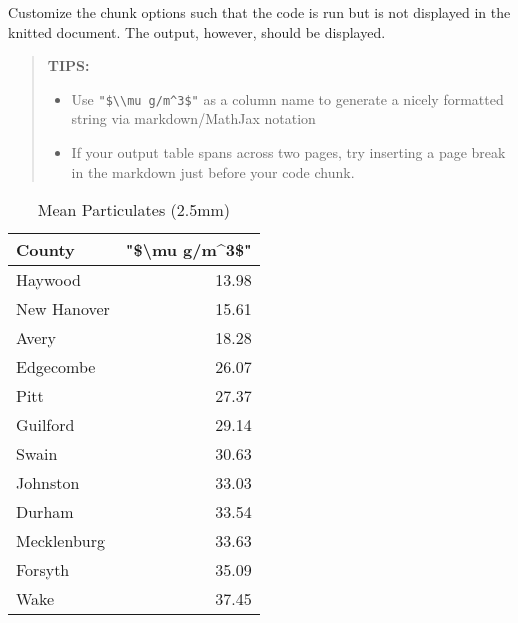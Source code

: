 \documentclass[
]{article}
\begin{document}
Customize the chunk options such that the code is run but is not
displayed in the knitted document. The output, however, should be
displayed.

\begin{quote}
\textbf{TIPS:}

\begin{itemize}
\item
  Use \texttt{"\$\textbackslash{}\textbackslash{}mu\ g/m\^{}3\$"} as a
  column name to generate a nicely formatted string via markdown/MathJax
  notation
\item
  If your output table spans across two pages, try inserting a page
  break in the markdown just before your code chunk.
\end{itemize}
\end{quote}

\begin{table}
\begin{table}

\caption{\label{tab:data.summary}Mean Particulates (2.5mm)}
\centering
\begin{tabular}[t]{l|r}
\hline
County & "\$\textbackslash{}mu g/m\textasciicircum{}3\$"\\
\hline
Haywood & 13.98\\
\hline
New Hanover & 15.61\\
\hline
Avery & 18.28\\
\hline
Edgecombe & 26.07\\
\hline
Pitt & 27.37\\
\hline
Guilford & 29.14\\
\hline
Swain & 30.63\\
\hline
Johnston & 33.03\\
\hline
Durham & 33.54\\
\hline
Mecklenburg & 33.63\\
\hline
Forsyth & 35.09\\
\hline
Wake & 37.45\\
\hline
\end{tabular}
\end{table}\begin{table}


\end{table}
\end{table}
\end{document}
